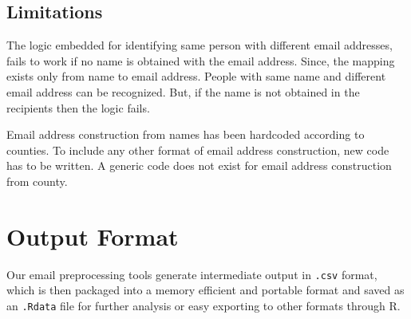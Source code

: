\documentclass[fleqn]{MJDArticle}
\begin{document}
\subsection{Limitations}
The logic embedded for identifying same person with different email addresses, fails to work if no name is obtained with the email address. Since, the mapping exists only from name to email address. People with same name and different email address can be recognized. But, if the name is not obtained in the recipients then the logic fails. 
\par 
Email address construction from names has been hardcoded according to counties. To include any other format of email address construction, new code has to be written. A generic code does not exist for email address construction from county.


\section{Output Format}

Our email preprocessing tools generate intermediate output in \texttt{.csv} format, which is then packaged into a memory efficient and portable format and saved as an \texttt{.Rdata} file for further analysis or easy exporting to other formats through R. 
\end{document}

